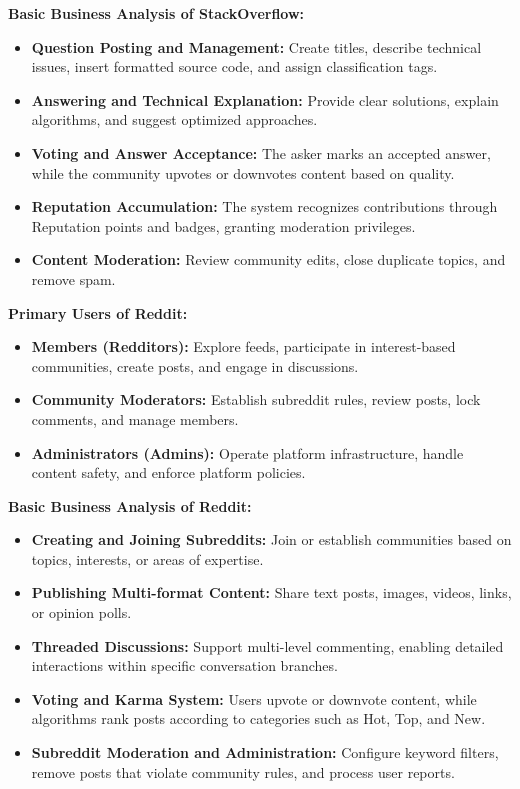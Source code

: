 \noindent \textbf{Basic Business Analysis of StackOverflow:}
\begin{itemize}
    \item \textbf{Question Posting and Management:} Create titles, describe technical issues, insert formatted source code, and assign classification tags.
    \item \textbf{Answering and Technical Explanation:} Provide clear solutions, explain algorithms, and suggest optimized approaches.
    \item \textbf{Voting and Answer Acceptance:} The asker marks an accepted answer, while the community upvotes or downvotes content based on quality.
    \item \textbf{Reputation Accumulation:} The system recognizes contributions through Reputation points and badges, granting moderation privileges.
    \item \textbf{Content Moderation:} Review community edits, close duplicate topics, and remove spam.
\end{itemize}

\noindent \textbf{Primary Users of Reddit:}
\begin{itemize}
    \item \textbf{Members (Redditors):} Explore feeds, participate in interest-based communities, create posts, and engage in discussions.
    \item \textbf{Community Moderators:} Establish subreddit rules, review posts, lock comments, and manage members.
    \item \textbf{Administrators (Admins):} Operate platform infrastructure, handle content safety, and enforce platform policies.
\end{itemize}


\noindent \textbf{Basic Business Analysis of Reddit:}
\begin{itemize}
    \item \textbf{Creating and Joining Subreddits:} Join or establish communities based on topics, interests, or areas of expertise.
    \item \textbf{Publishing Multi-format Content:} Share text posts, images, videos, links, or opinion polls.
    \item \textbf{Threaded Discussions:} Support multi-level commenting, enabling detailed interactions within specific conversation branches.
    \item \textbf{Voting and Karma System:} Users upvote or downvote content, while algorithms rank posts according to categories such as Hot, Top, and New.
    \item \textbf{Subreddit Moderation and Administration:} Configure keyword filters, remove posts that violate community rules, and process user reports.
\end{itemize}

